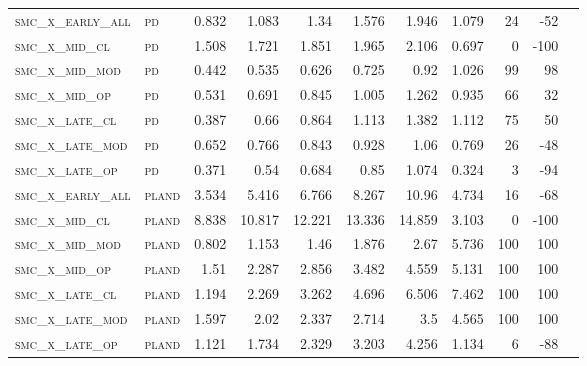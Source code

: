 \begin{landscape}
\begin{center}
\begin{footnotesize}
\begin{longtable}{llrrrrrr|rrr}
\textsc{smc\_x\_early\_all} & \textsc{pd        }   & 0.832      & 1.083      & 1.34       & 1.576      & 1.946      & 1.079      & 24    & -52    \\
\textsc{smc\_x\_mid\_cl   } & \textsc{pd        }   & 1.508      & 1.721      & 1.851      & 1.965      & 2.106      & 0.697      & 0     & -100   \\
\textsc{smc\_x\_mid\_mod  } & \textsc{pd        }   & 0.442      & 0.535      & 0.626      & 0.725      & 0.92       & 1.026      & 99    & 98     \\
\textsc{smc\_x\_mid\_op   } & \textsc{pd        }   & 0.531      & 0.691      & 0.845      & 1.005      & 1.262      & 0.935      & 66    & 32     \\
\textsc{smc\_x\_late\_cl  } & \textsc{pd        }   & 0.387      & 0.66       & 0.864      & 1.113      & 1.382      & 1.112      & 75    & 50     \\
\textsc{smc\_x\_late\_mod } & \textsc{pd        }   & 0.652      & 0.766      & 0.843      & 0.928      & 1.06       & 0.769      & 26    & -48    \\
\textsc{smc\_x\_late\_op  } & \textsc{pd        }   & 0.371      & 0.54       & 0.684      & 0.85       & 1.074      & 0.324      & 3     & -94    \\
\textsc{smc\_x\_early\_all} & \textsc{pland     }   & 3.534      & 5.416      & 6.766      & 8.267      & 10.96      & 4.734      & 16    & -68    \\
\textsc{smc\_x\_mid\_cl   } & \textsc{pland     }   & 8.838      & 10.817     & 12.221     & 13.336     & 14.859     & 3.103      & 0     & -100   \\
\textsc{smc\_x\_mid\_mod  } & \textsc{pland     }   & 0.802      & 1.153      & 1.46       & 1.876      & 2.67       & 5.736      & 100   & 100    \\
\textsc{smc\_x\_mid\_op   } & \textsc{pland     }   & 1.51       & 2.287      & 2.856      & 3.482      & 4.559      & 5.131      & 100   & 100    \\
\textsc{smc\_x\_late\_cl  } & \textsc{pland     }   & 1.194      & 2.269      & 3.262      & 4.696      & 6.506      & 7.462      & 100   & 100    \\
\textsc{smc\_x\_late\_mod } & \textsc{pland     }   & 1.597      & 2.02       & 2.337      & 2.714      & 3.5        & 4.565      & 100   & 100    \\
\textsc{smc\_x\_late\_op  } & \textsc{pland     }   & 1.121      & 1.734      & 2.329      & 3.203      & 4.256      & 1.134      & 6     & -88    \\

\end{longtable}
\end{footnotesize}
\end{center}
\end{landscape}

